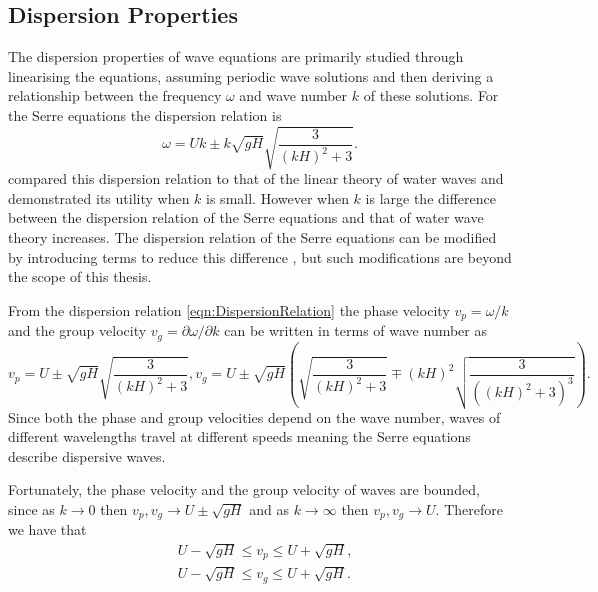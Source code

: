 \subsection{Dispersion Properties}
The dispersion properties of wave equations are primarily studied through linearising the equations, assuming periodic wave solutions and then deriving a relationship between the frequency $\omega$ and wave number $k$ of these solutions. For the Serre equations the dispersion relation \cite{Li-2014-169} is
\begin{equation}
\label{eqn:DispersionRelation}
\omega = Uk \pm k \sqrt{gH} \sqrt{\frac{3}{\left(kH\right)^2 + 3}}.
\end{equation}
\citet{Barthelemy-2004-315} compared this dispersion relation to that of the linear theory of water waves and demonstrated its utility when $k$ is small. However when $k$ is large the difference between the dispersion relation of the Serre equations and that of water wave theory increases. The dispersion relation of the Serre equations can be modified by introducing terms to reduce this difference \cite{Barthelemy-2004-315}, but such modifications are beyond the scope of this thesis.


From the dispersion relation \eqref{eqn:DispersionRelation} the phase velocity $v_p = \omega / k$  and the group velocity $v_g = \partial \omega / \partial  k$ can be written in terms of wave number as
\begin{subequations}
	\label{eqn:WaveVelocities}
	\begin{equation}
	\label{eqn:WaveVelocitiesPhase}
	v_p = U \pm \sqrt{gH}\sqrt{\frac{3}{\left(kH\right)^2 + 3}},
	\end{equation}
	\begin{equation}
	\label{eqn:WaveVelocitiesGroup}
	v_g = U \pm \sqrt{gH} \left(\sqrt{\frac{3}{\left(kH\right)^2 + 3}} \mp \left(kH\right)^2 \sqrt{\frac{3}{\left(\left(kH\right)^2 + 3 \right)^3}}\right).
	\end{equation}
\end{subequations}
Since both the phase and group velocities depend on the wave number, waves of different wavelengths travel at different speeds meaning the Serre equations describe dispersive waves.

Fortunately, the phase velocity and the group velocity of waves are bounded, since as $k \rightarrow 0$ then $v_p,v_g \rightarrow U \pm \sqrt{gH}$ and as $k \rightarrow \infty$ then  $v_p,v_g \rightarrow U$. Therefore we have that
\begin{subequations}
\begin{align}
&U - \sqrt{gH} \le v_p \le U + \sqrt{gH}, \label{eqn:WaveVelocitiesBound} \\
&U - \sqrt{gH} \le v_g \le U + \sqrt{gH}.
\end{align}
\end{subequations}

